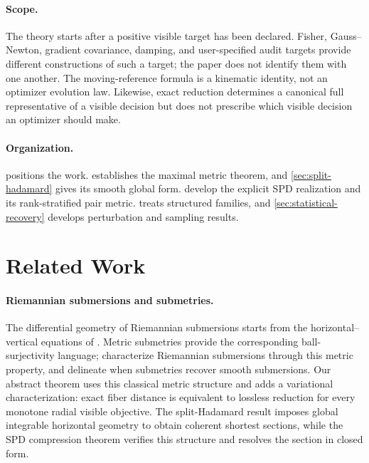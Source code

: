\documentclass[10pt]{article}
\theoremstyle{plain}
\theoremstyle{definition}
\theoremstyle{remark}
\begin{document}
\paragraph{Scope.}
The theory starts after a positive visible target has been declared.  Fisher,
Gauss--Newton, gradient covariance, damping, and user-specified audit targets
provide different constructions of such a target; the paper does not identify
them with one another.  The moving-reference formula is a kinematic identity,
not an optimizer evolution law.  Likewise, exact reduction determines a
canonical full representative of a visible decision but does not prescribe
which visible decision an optimizer should make.

\paragraph{Organization.}
 positions the work.  
establishes the maximal metric theorem, and \cref{sec:split-hadamard} gives its
smooth global form.  
develop the explicit SPD realization and its rank-stratified pair metric.
 treats structured families, and
\cref{sec:statistical-recovery} develops perturbation and sampling results.

\section{Related Work}
\label{sec:related}

\paragraph{Riemannian submersions and submetries.}
The differential geometry of Riemannian submersions starts from the
horizontal--vertical equations of \citet{oneill1966submersion}.  Metric
submetries provide the corresponding ball-surjectivity language;
\citet{berestovskii2000metric} characterize Riemannian submersions through
this metric property, and \citet{guijarro2011submetries} delineate when
submetries recover smooth submersions.  Our abstract theorem uses this
classical metric structure and adds a variational characterization: exact
fiber distance is equivalent to lossless reduction for every monotone radial
visible objective.  The split-Hadamard result imposes global integrable
horizontal geometry to obtain coherent shortest sections, while the SPD
compression theorem verifies this structure and resolves the section in
closed form.
\end{document}
